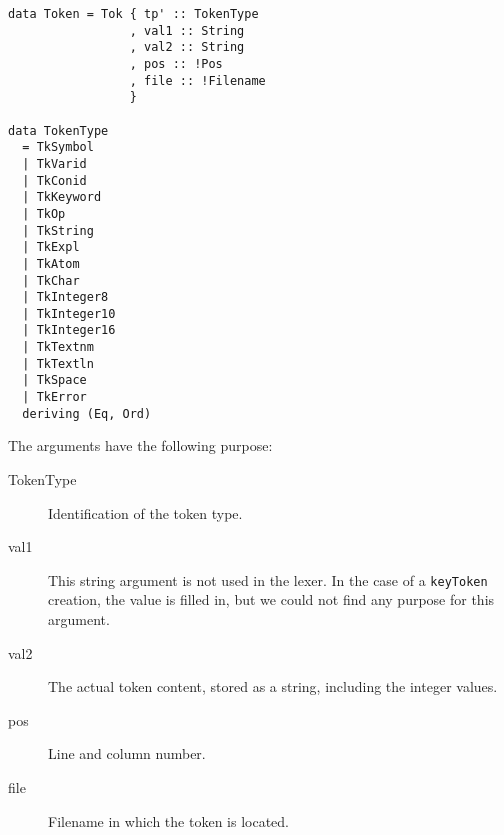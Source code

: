 \begin{verbatim}
data Token = Tok { tp' :: TokenType
                 , val1 :: String
                 , val2 :: String
                 , pos :: !Pos
                 , file :: !Filename
                 }

data TokenType
  = TkSymbol
  | TkVarid
  | TkConid
  | TkKeyword
  | TkOp
  | TkString
  | TkExpl
  | TkAtom
  | TkChar
  | TkInteger8
  | TkInteger10
  | TkInteger16
  | TkTextnm
  | TkTextln
  | TkSpace
  | TkError
  deriving (Eq, Ord)
\end{verbatim}
%
The arguments have the following purpose:
\begin{description}
  \item[TokenType]
    Identification of the token type. %
  \item[val1]
    This string argument is not used in the lexer.
    In the case of a \texttt{keyToken} creation, the value is filled in, but we could not find any purpose for this argument.
  \item[val2]
    The actual token content, stored as a string, including the integer values.
  \item[pos]
    Line and column number.
  \item[file]
     Filename in which the token is located.
\end{description}
